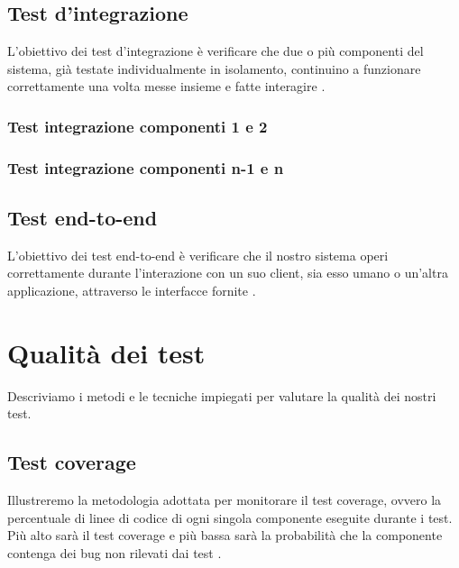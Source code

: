 \subsection{Test d'integrazione}

L'obiettivo dei test d'integrazione è verificare che due o più componenti del sistema, già testate individualmente in isolamento, continuino a funzionare correttamente una volta messe insieme e fatte interagire \cite{bettini2021tdd}.

\subsubsection{Test integrazione componenti 1 e 2}

\subsubsection{Test integrazione componenti n-1 e n}

\subsection{Test end-to-end}

L'obiettivo dei test end-to-end è verificare che il nostro sistema operi correttamente durante l'interazione con un suo client, sia esso umano o un'altra applicazione, attraverso le interfacce fornite \cite{bettini2021tdd}.

\section{Qualit\`a dei test}

Descriviamo i metodi e le tecniche impiegati per valutare la qualità dei nostri test.

\subsection{Test coverage}

Illustreremo la metodologia adottata per monitorare il test coverage, ovvero la percentuale di linee di codice di ogni singola componente eseguite durante i test. Più alto sarà il test coverage e più bassa sarà la probabilità che la componente contenga dei bug non rilevati dai test \cite{bettini2021tdd}.

